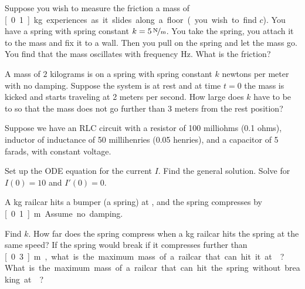 \begin{exercise}
Suppose you wish to measure the friction a mass of \unit[0.1]{kg} experiences
as it slides along a floor (you wish to find $c$).  You have a spring with
spring constant $k=\unitfrac[5]{N}{m}$.  You take the spring, you attach it
to the mass and fix it to a wall.  Then you pull on the spring and let the
mass go.  You find that the mass oscillates with frequency \unit[1]{Hz}.
What is the friction?
\end{exercise}

\setcounter{exercise}{100}

\begin{exercise}
A mass of $2$ kilograms is on a spring with spring constant $k$ newtons per
meter with no damping.  Suppose the system is at rest and at time $t=0$ the
mass is kicked and starts traveling at 2 meters per second.  How large
does $k$ have to be to so that the mass does not go further than 3 meters
from the rest position?
\end{exercise}

\begin{exercise}
Suppose we have an RLC circuit with a resistor of 100 milliohms (0.1 ohms),
inductor of inductance of 50 millihenries (0.05 henries), and a capacitor of 5 farads, with
constant voltage.
\begin{tasks}
\task Set up the ODE equation for the current $I$.
\task Find the general solution.
\task Solve for $I(0) = 10$ and $I'(0) = 0$.
\end{tasks}
\end{exercise}

\begin{exercise}
\pagebreak[2]
A \unit[5000]{kg} railcar hits a bumper (a spring) at ,
and the spring compresses by \unit[0.1]{m}.  Assume no damping.
\begin{tasks}
\task Find $k$.
\task How far does the spring compress when a
\unit[10000]{kg} railcar hits the spring at the same speed?
\task If the spring
would break if it compresses further than \unit[0.3]{m}, what is the maximum
mass of a railcar that can hit it at ?
\task What is
the maximum mass of a railcar that can hit the spring without breaking
at ?
\end{tasks}
\end{exercise}

